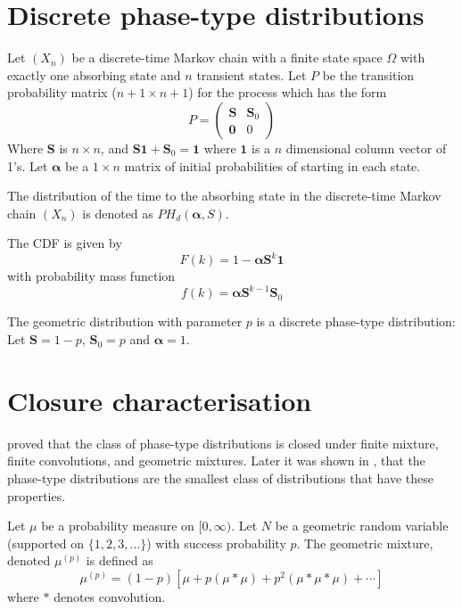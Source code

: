 \section{Discrete phase-type distributions}
\begin{defn}
\cite{neuts1981}
Let $(X_n)$ be a discrete-time Markov chain with a finite state space $\Omega$ with exactly one absorbing state and $n$ transient states.
Let $P$ be the transition probability matrix ($n + 1 \times n + 1$) for the process which has the form
$$
P = \begin{pmatrix}
\mathbf{S} & \mathbf{S}_0\\
\mathbf{0} & 0
\end{pmatrix}
$$
Where $\mathbf{S}$ is $n \times n$, and $\mathbf{S} \mathbf{1}  + \mathbf{S}_0 = \mathbf{1}$ where $\mathbf{1}$ is a $n$ dimensional column vector of 1's.
Let $\boldsymbol{\alpha}$ be a $1 \times n$ matrix of initial probabilities of starting in each state.

The distribution of the time to the absorbing state in the discrete-time Markov chain $(X_n)$ is denoted as $PH_d(\boldsymbol{\alpha}, S)$.

The CDF is given by
$$
F(k) = 1 - \boldsymbol{\alpha} \mathbf{S}^k \mathbf{1}
$$
with probability mass function
$$
f(k) = \boldsymbol{\alpha} \mathbf{S}^{k - 1} \mathbf{S}_0
$$
\end{defn}

\begin{example}
The geometric distribution  with parameter $p$ is a discrete phase-type distribution:
Let $\mathbf S = 1 - p$, $\mathbf{S}_0 = p$ and $\boldsymbol{\alpha} = 1$.
\end{example}


\section{Closure characterisation}

\cite{neuts1975} proved that the class of phase-type distributions is closed under finite mixture, finite convolutions, and geometric mixtures.
Later it was shown in \cite{maier1992}, that the phase-type distributions are the smallest class of distributions that have these properties.

\begin{defn} \cite{maier1992}
Let $\mu$ be a probability measure on $[0, \infty)$.
Let $N$ be a geometric random variable (supported on $\{1,2,3,\ldots\}$) with success probability $p$.
The geometric mixture, denoted $\mu^{(p)}$ is defined as
$$
\mu^{(p)} = (1 - p) [\mu + p (\mu * \mu) + p^2 (\mu * \mu * \mu) + \cdots]
$$
where $*$ denotes convolution.
\end{defn}

